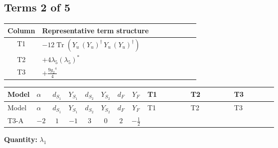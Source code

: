 \documentclass[8pt]{article}
\begin{document}
\begin{landscape}
\subsection*{Terms 2 of 5}
\begin{center}
\begin{tabular}{@{}c >{\raggedright\arraybackslash}p{0.82\linewidth}@{}}
\toprule
Column & Representative term structure \\
\midrule
T1 & \(\displaystyle -12 \operatorname{Tr}\!\left({Y_u}\,\left({Y_u}\right)^{\dagger}\,{Y_u}\,\left({Y_u}\right)^{\dagger}\right)\) \\
\midrule
T2 & \(\displaystyle +4 {\lambda_5} \left({\lambda_5}\right)^{*}\) \\
\midrule
T3 & \(\displaystyle +\frac{9 {g_2}^4}{4}\) \\
\midrule
\bottomrule
\end{tabular}
\end{center}
\smallskip
\tiny
\begin{longtable}{@{}llcccccc >{\raggedright\arraybackslash}p{0.21\linewidth} >{\raggedright\arraybackslash}p{0.21\linewidth} >{\raggedright\arraybackslash}p{0.21\linewidth}@{}}
\toprule
Model & $\alpha$ & $d_{S_1}$ & $Y_{S_1}$ & $d_{S_2}$ & $Y_{S_2}$ & $d_F$ & $Y_F$ & T1 & T2 & T3 \\
\midrule
\endfirsthead
\toprule
Model & $\alpha$ & $d_{S_1}$ & $Y_{S_1}$ & $d_{S_2}$ & $Y_{S_2}$ & $d_F$ & $Y_F$ & T1 & T2 & T3 \\
\midrule
\endhead
T3-A & $-2$ & $1$ & $-1$ & $3$ & $0$ & $2$ & $-\frac{1}{2}$ & \scriptsize\adjustbox{max width=\linewidth}{$\begin{gathered} -12 \operatorname{Tr}\!\left({Y_u}\,\left({Y_u}\right)^{\dagger}\,{Y_u}\,\left({Y_u}\right)^{\dagger}\right)\end{gathered}$} & \scriptsize\adjustbox{max width=\linewidth}{$\begin{gathered} +4 {\lambda_5} \left({\lambda_5}\right)^{*}\end{gathered}$} & \scriptsize\adjustbox{max width=\linewidth}{$\begin{gathered} +\frac{9 {g_2}^4}{4}\end{gathered}$} \\
\midrule
\bottomrule
\end{longtable}
\clearpage
\noindent\textbf{Quantity: }$\lambda_1$\par\smallskip

\end{landscape}
\end{document}
